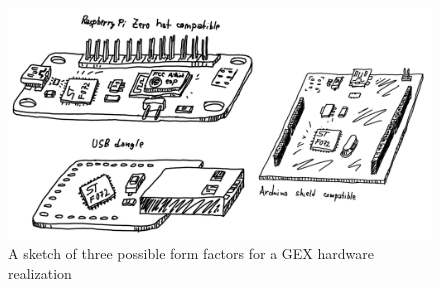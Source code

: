 \begin{figure}[h]
	\centering
	\includegraphics[width=\textwidth] {img/gex-ff-sketches.png}
	\caption[Form factor sketches]{\label{fig:ff-sketches}A sketch of three possible form factors for a GEX hardware realization}
\end{figure}









